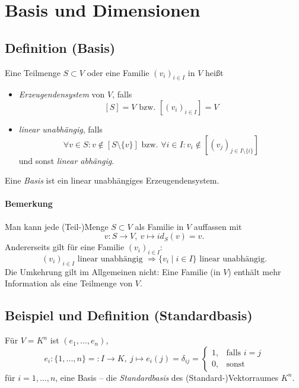 \section{Basis und Dimensionen}

\subsection{Definition (Basis)}
	\begin{Definition}[Basis]
		Eine Teilmenge $S\subset V$ oder eine Familie $(v_i)_{i\in I}$ in $ V $ heißt
	\begin{itemize}
		\item \emph{Erzeugendensystem} von $ V $, falls \[[S] = V \text{ bzw. } [(v_i)_{i\in I}] = V\]
		\item \emph{linear unabhängig}, falls \[\forall v\in S: v \notin [S\setminus\{{v\}}] \text{ bzw. } \forall i\in I: v_i \notin [(v_j)_{j\in I\setminus\{{i\}}}]\] und sonst \emph{linear abhängig}.
	\end{itemize}
        Eine \emph{Basis} ist ein linear unabhängiges Erzeugendensystem.
	\end{Definition}

\paragraph{Bemerkung}
	Man kann jede (Teil-)Menge $S\subset V$ als Familie in $V$ auffassen mit
		\[v: S \to V,\ v\mapsto id_S(v) = v.\]
	Andererseits gilt für eine Familie $(v_i)_{i\in I} $:
		\[(v_i)_{i\in I} \text{ linear unabhängig } \Rightarrow \{v_i \mid i\in I\} \text{ linear unabhängig.}\]
	Die Umkehrung gilt im Allgemeinen nicht: Eine Familie (in $ V $) enthält mehr Information als eine Teilmenge von $ V $.
	
\subsection{Beispiel und Definition (Standardbasis)}
	\begin{Definition}[Standardbasis]
		Für $V = K^n$ ist $(e_1, ... , e_n)$,
	\begin{equation*}
		e_i:\{{1, ... ,n\}} =: I\to K,\ j\mapsto e_i(j)= \delta_{ij}=
		\begin{cases}
			1,& \text{falls } i=j\\
			0,& \text{sonst}
		\end{cases}
	\end{equation*}
	für $i=1,\dots,n$, eine Basis -- die \emph{Standardbasis} des (Standard-)Vektorraumes $K^n$.
	\end{Definition}

